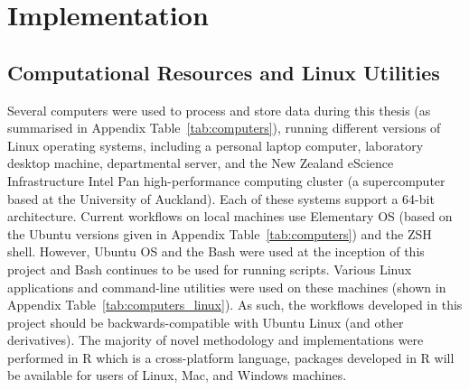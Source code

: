 \section{Implementation}



\subsection{Computational Resources and Linux Utilities}

Several computers were used to process and store data during this thesis (as summarised in Appendix Table~\ref{tab:computers}), running different versions of Linux operating systems, including a personal laptop computer, laboratory desktop machine, departmental server, and the New Zealand eScience Infrastructure Intel Pan high-performance computing cluster (a supercomputer based at the University of Auckland). Each of these systems support a 64-bit architecture. Current workflows on local machines use Elementary OS (based on the Ubuntu versions given in Appendix Table~\ref{tab:computers}) and the ZSH shell. However, Ubuntu OS and the Bash were used at the inception of this project and Bash continues to be used for running scripts. Various Linux applications and command-line utilities were used on these machines (shown in Appendix Table~\ref{tab:computers_linux}). As such, the workflows developed in this project should be backwards-compatible with Ubuntu Linux (and other derivatives). The majority of novel methodology and implementations were performed in R which is a cross-platform language, packages developed in R will be available for users of Linux, Mac, and Windows machines.  


